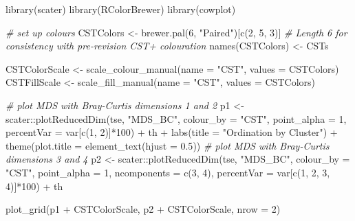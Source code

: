 \documentclass[
  oneside]{book}
\newenvironment{Shaded}{\begin{snugshade}}{\end{snugshade}}
\newcommand{\AttributeTok}[1]{\textcolor[rgb]{0.77,0.63,0.00}{#1}}
\newcommand{\CommentTok}[1]{\textcolor[rgb]{0.56,0.35,0.01}{\textit{#1}}}
\newcommand{\DecValTok}[1]{\textcolor[rgb]{0.00,0.00,0.81}{#1}}
\newcommand{\FloatTok}[1]{\textcolor[rgb]{0.00,0.00,0.81}{#1}}
\newcommand{\FunctionTok}[1]{\textcolor[rgb]{0.00,0.00,0.00}{#1}}
\newcommand{\NormalTok}[1]{#1}
\newcommand{\OtherTok}[1]{\textcolor[rgb]{0.56,0.35,0.01}{#1}}
\newcommand{\SpecialCharTok}[1]{\textcolor[rgb]{0.00,0.00,0.00}{#1}}
\newcommand{\StringTok}[1]{\textcolor[rgb]{0.31,0.60,0.02}{#1}}
\begin{document}
\begin{Shaded}
\begin{Highlighting}[]
\FunctionTok{library}\NormalTok{(scater)}
\FunctionTok{library}\NormalTok{(RColorBrewer)}
\FunctionTok{library}\NormalTok{(cowplot)}

\CommentTok{\# set up colours}
\NormalTok{CSTColors }\OtherTok{\textless{}{-}} \FunctionTok{brewer.pal}\NormalTok{(}\DecValTok{6}\NormalTok{, }\StringTok{"Paired"}\NormalTok{)[}\FunctionTok{c}\NormalTok{(}\DecValTok{2}\NormalTok{, }\DecValTok{5}\NormalTok{, }\DecValTok{3}\NormalTok{)] }\CommentTok{\# Length 6 for consistency with pre{-}revision CST+ colouration}
\FunctionTok{names}\NormalTok{(CSTColors) }\OtherTok{\textless{}{-}}\NormalTok{ CSTs}

\NormalTok{CSTColorScale }\OtherTok{\textless{}{-}} \FunctionTok{scale\_colour\_manual}\NormalTok{(}\AttributeTok{name =} \StringTok{"CST"}\NormalTok{, }\AttributeTok{values =}\NormalTok{ CSTColors)}
\NormalTok{CSTFillScale }\OtherTok{\textless{}{-}} \FunctionTok{scale\_fill\_manual}\NormalTok{(}\AttributeTok{name =} \StringTok{"CST"}\NormalTok{, }\AttributeTok{values =}\NormalTok{ CSTColors)}

\CommentTok{\# plot MDS with Bray{-}Curtis dimensions 1 and 2}
\NormalTok{p1 }\OtherTok{\textless{}{-}}\NormalTok{ scater}\SpecialCharTok{::}\FunctionTok{plotReducedDim}\NormalTok{(tse, }\StringTok{"MDS\_BC"}\NormalTok{, }\AttributeTok{colour\_by =} \StringTok{"CST"}\NormalTok{, }\AttributeTok{point\_alpha =} \DecValTok{1}\NormalTok{, }
                             \AttributeTok{percentVar =}\NormalTok{ var[}\FunctionTok{c}\NormalTok{(}\DecValTok{1}\NormalTok{, }\DecValTok{2}\NormalTok{)]}\SpecialCharTok{*}\DecValTok{100}\NormalTok{) }\SpecialCharTok{+}\NormalTok{ th }\SpecialCharTok{+} \FunctionTok{labs}\NormalTok{(}\AttributeTok{title =} \StringTok{"Ordination by Cluster"}\NormalTok{) }\SpecialCharTok{+}
                             \FunctionTok{theme}\NormalTok{(}\AttributeTok{plot.title =} \FunctionTok{element\_text}\NormalTok{(}\AttributeTok{hjust =} \FloatTok{0.5}\NormalTok{))}
\CommentTok{\# plot MDS with Bray{-}Curtis dimensions 3 and 4}
\NormalTok{p2 }\OtherTok{\textless{}{-}}\NormalTok{ scater}\SpecialCharTok{::}\FunctionTok{plotReducedDim}\NormalTok{(tse, }\StringTok{"MDS\_BC"}\NormalTok{, }\AttributeTok{colour\_by =} \StringTok{"CST"}\NormalTok{, }\AttributeTok{point\_alpha =} \DecValTok{1}\NormalTok{, }
                             \AttributeTok{ncomponents =} \FunctionTok{c}\NormalTok{(}\DecValTok{3}\NormalTok{, }\DecValTok{4}\NormalTok{), }\AttributeTok{percentVar =}\NormalTok{ var[}\FunctionTok{c}\NormalTok{(}\DecValTok{1}\NormalTok{, }\DecValTok{2}\NormalTok{, }\DecValTok{3}\NormalTok{, }\DecValTok{4}\NormalTok{)]}\SpecialCharTok{*}\DecValTok{100}\NormalTok{) }\SpecialCharTok{+}\NormalTok{ th}

\FunctionTok{plot\_grid}\NormalTok{(p1 }\SpecialCharTok{+}\NormalTok{ CSTColorScale, p2 }\SpecialCharTok{+}\NormalTok{ CSTColorScale, }\AttributeTok{nrow =} \DecValTok{2}\NormalTok{)}
\end{Highlighting}
\end{Shaded}
\end{document}
